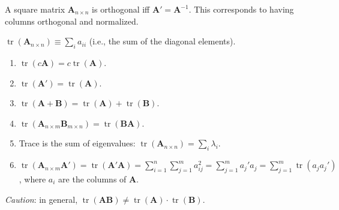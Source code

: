 \documentclass[8pt,letterpaper, landscape]{extarticle} %
\newcommand{\mA}{\ensuremath{\mathbf{A}}}
\newcommand{\mB}{\ensuremath{\mathbf{B}}}
\begin{document}
\begin{multicols}{3}
\begin{description}
 A square matrix $ \mA_{n \times n} $ is orthogonal iff $ \mA' = \mA^{-1} $. This corresponds to having columns orthogonal and normalized.

 $ \operatorname{tr}(\mA_{n \times n}) \equiv \sum_i a_{ii} $ (i.e., the sum of the diagonal elements).
\begin{enumerate}
\item $ \operatorname{tr}(c \mA) = c \operatorname{tr}(\mA) $.
\item $ \operatorname{tr}(\mA') = \operatorname{tr}(\mA) $.
\item $ \operatorname{tr}(\mA + \mB) = \operatorname{tr}(\mA) + \operatorname{tr}(\mB) $.
\item $ \operatorname{tr}(\mA_{n \times m} \mB_{m \times n}) = \operatorname{tr}(\mB \mA) $.
\item Trace is the sum of eigenvalues: $ \operatorname{tr}(\mA_{n \times n}) = \sum_i \lambda_i $.
\item $ \operatorname{tr}(\mA_{n \times m} \mA') = \operatorname{tr}(\mA' \mA) = \sum_{i=1}^{n} \sum_{j=1}^{m} a_{ij}^2 = \sum_{j=1}^{m} a_{j}' a_j =  \sum_{j=1}^{m} \operatorname{tr} (a_{j} a_{j}') $, where $ a_i $ are the columns of $ \mA $.
\end{enumerate}
\textit{Caution}: in general, $ \operatorname{tr}(\mA  \mB) \neq \operatorname{tr}(\mA) \cdot \operatorname{tr}(\mB) $.


\end{description}
\end{multicols}
\end{document}
